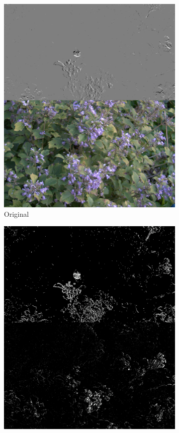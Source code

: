 \documentclass[sigchi,screen]{acmart}
\begin{document}
\begin{figure}[htp]
  \centering
  \begin{subfigure}{0.25\linewidth}
    \centering
    \includegraphics[width=\linewidth]{figures/preprocessings/original.jpg}
    \caption{Original}
  \end{subfigure}%
  \begin{subfigure}{0.25\linewidth}
    \centering
    \includegraphics[width=\linewidth]{figures/preprocessings/background_subtraction.jpg}

\end{subfigure}
\end{figure}
\end{document}
